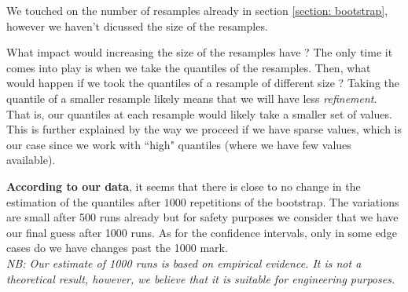 \documentclass{article}
\begin{document}
We touched on the number of resamples already in section \ref{section: bootstrap}, however we haven't dicussed the size of the resamples.

What impact would increasing the size of the resamples have ? The only time it comes into play is when we take the quantiles of the resamples. Then, what would happen if we took the quantiles of a resample of different size ? Taking the quantile of a smaller resample likely means that we will have less \textit{refinement}. That is, our quantiles at each resample would likely take a smaller set of values. This is further explained by the way we proceed if we have sparse values, which is our case since we work with ``high" quantiles (where we have few values available).

\textbf{According to our data}, it seems that there is close to no change in the estimation of the quantiles after $1000$ repetitions of the bootstrap. The variations are small after 500 runs already but for safety purposes we consider that we have our final guess after 1000 runs. As for the confidence intervals, only in some edge cases do we have changes past the 1000 mark. \\
\textit{NB: Our estimate of 1000 runs is based on empirical evidence. It is not a theoretical result, however, we believe that it is suitable for engineering purposes.}

\end{document}
